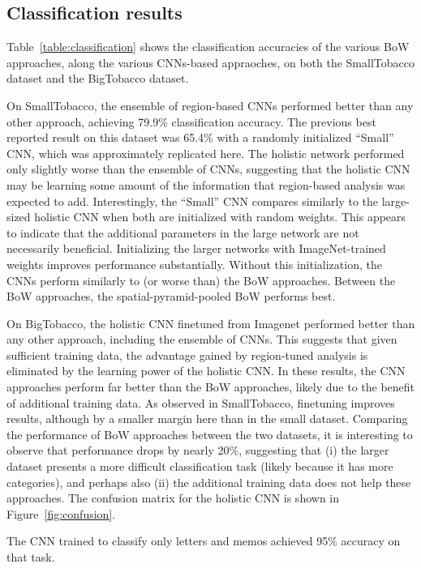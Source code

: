 \documentclass[conference]{IEEEtran_suppress}
\begin{document}
\subsection{Classification results}

Table~\ref{table:classification} shows the classification accuracies of the various BoW approaches, along the various CNNs-based appraoches, on both the SmallTobacco dataset and the BigTobacco dataset. 

On SmallTobacco, the ensemble of region-based CNNs performed better than any other approach, achieving 79.9\% classification accuracy. The previous best reported result on this dataset was 65.4\% with a randomly initialized ``Small'' CNN, which was approximately replicated here. The holistic network performed only slightly worse than the ensemble of CNNs, suggesting that the holistic CNN may be learning some amount of the information that region-based analysis was expected to add. Interestingly, the ``Small'' CNN compares similarly to the large-sized holistic CNN when both are initialized with random weights. This appears to indicate that the additional parameters in the large network are not necessarily beneficial. Initializing the larger networks with ImageNet-trained weights improves performance substantially. Without this initialization, the CNNs perform similarly to (or worse than) the BoW approaches. Between the BoW approaches, the spatial-pyramid-pooled BoW performs best.

On BigTobacco, the holistic CNN finetuned from Imagenet performed better than any other approach, including the ensemble of CNNs. This suggests that given sufficient training data, the advantage gained by region-tuned analysis is eliminated by the learning power of the holistic CNN. In these results, the CNN approaches perform far better than the BoW approaches, likely due to the benefit of additional training data. As observed in SmallTobacco, finetuning improves results, although by a smaller margin here than in the small dataset. Comparing the performance of BoW approaches between the two datasets, it is interesting to observe that performance drops by nearly 20\%, suggesting that (i) the larger dataset presents a more difficult classification task (likely because it has more categories), and perhaps also (ii) the additional training data does not help these approaches. The confusion matrix for the holistic CNN is shown in Figure~\ref{fig:confusion}. 

The CNN trained to classify only letters and memos achieved 95\% accuracy on that task. 
\end{document}
